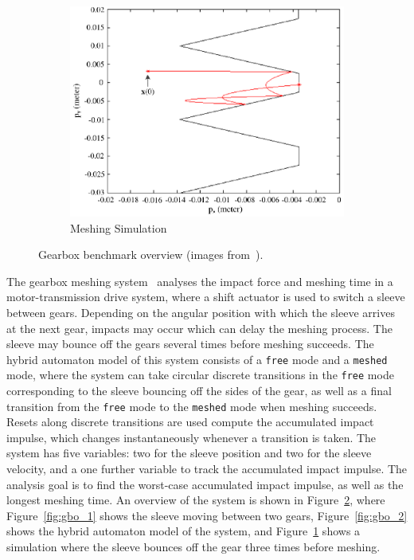 \begin{figure}[t]
\begin{subfigure}{0.3\textwidth}
\centering
    \includegraphics[width=1.0\textwidth]{images/gb_overview3.png}
    \caption{Meshing Simulation}\label{fig:gbo_3}
\end{subfigure}
\vspace{-0.15cm}
\caption{Gearbox benchmark overview (images from~\cite{chen2014motor}).}\label{fig:gb_overview}
\vspace{-0.15cm}
\end{figure}

The gearbox meshing system~\cite{chen2014motor} analyses the impact force and meshing time in a motor-transmission drive system,
where a shift actuator is used to switch a sleeve between gears.
%
Depending on the angular position with which the sleeve arrives at the next gear, impacts may occur which can delay the meshing process.
%
The sleeve may bounce off the gears several times before meshing succeeds.
%
The hybrid automaton model of this system consists of a \texttt{free} mode and a \texttt{meshed} mode, where the system can take circular
discrete transitions in the \texttt{free} mode corresponding to the sleeve bouncing off the sides of the gear, as well as a final transition
from the \texttt{free} mode to the \texttt{meshed} mode when meshing succeeds.
%
Resets along discrete transitions are used compute the accumulated impact impulse, which changes instantaneously whenever a transition is taken.
%
The system has five variables: two for the sleeve position and two for the sleeve velocity, and a one further variable to track the accumulated
impact impulse. 
%
The analysis goal is to find the worst-case accumulated impact impulse, as well as the longest meshing time.
%
An overview of the system is shown in Figure~\ref{fig:gb_overview}, where Figure~\ref{fig:gbo_1} shows the sleeve moving between two gears,
Figure~\ref{fig:gbo_2} shows the hybrid automaton model of the system, and Figure~\ref{fig:gbo_3} shows a simulation where the sleeve bounces off
the gear three times before meshing.

